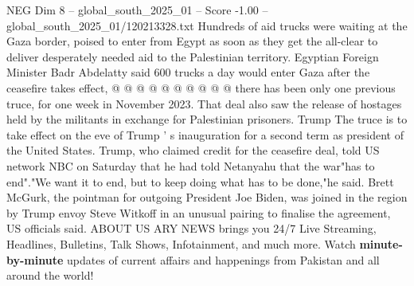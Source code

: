 \begin{textsample}{NEG Dim 8 – global\_south\_2025\_01 – Score -1.00 – global\_south\_2025\_01/120213328.txt}
Hundreds of aid trucks were waiting at the Gaza border, poised to enter from Egypt as soon as they get the all-clear to deliver desperately needed aid to the Palestinian territory.
Egyptian Foreign Minister Badr Abdelatty said 600 trucks a day would enter Gaza after the ceasefire takes effect, @ @ @ @ @ @ @ @ @ @ there has been only one previous truce, for one week in November 2023.
That deal also saw the release of hostages held by the militants in exchange for Palestinian prisoners.
Trump The truce is to take effect on the eve of Trump ' s inauguration for a second term as president of the United States.
Trump, who claimed credit for the ceasefire deal, told US network NBC on Saturday that he had told Netanyahu that the war"has to end"."We want it to end, but to keep doing what has to be done,"he said.
Brett McGurk, the pointman for outgoing President Joe Biden, was joined in the region by Trump envoy Steve Witkoff in an unusual pairing to finalise the agreement, US officials said.
ABOUT US ARY NEWS brings you 24/7 Live Streaming, Headlines, Bulletins, Talk Shows, Infotainment, and much more.
Watch \textbf{minute-by-minute} updates of current affairs and happenings from Pakistan and all around the world!

\end{textsample}

